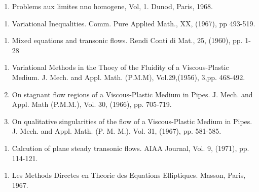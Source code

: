 \begin{thebibliography}{99}

  \begin{enumerate}
  \item Problems aux limites nno homogene, Vol, 1. Dunod, Paris,
 1968.\label{k68:e1} 
  \end{enumerate}
 
 
  \begin{enumerate}
  \item Variational Inequalities. Comm. Pure Applied Math., XX,
 (1967), pp 493-519.\label{k69:e1} 
  \end{enumerate}
 
 
  \begin{enumerate}
  \item Mixed equations and transonic flows. Rendi Conti di Mat., 25,
 (1960), pp. 1-28\label{k70:e1} 
  \end{enumerate}
 
 \pageoriginale
 
  \begin{enumerate}
  \item  Variational Methods in the Thoey of the Fluidity of a
 Viscous-Plastic Medium. J. Mech. and Appl. Math. (P.M.M),
 Vol.29,(1956), 3,pp. 468-492.\label{k71:e1} 

  \item On stagnant flow regions of a Viscous-Plastic Medium in
 Pipes. J. Mech. and  Appl. Math (P.M.M.), Vol. 30, (1966),
 pp. 705-719.\label{k71:e2} 
 
  \item On qualitative singularities of the flow of a Viscous-Plastic
 Medium in Pipes. J. Mech. and Appl. Math. (P. M. M.), Vol. 31,
 (1967), pp. 581-585.\label{k71:e3} 
  \end{enumerate}

 
  \begin{enumerate}
  \item  Calcution of plane steady transonic flows. AIAA Journal,
 Vol. 9, (1971), pp. 114-121.\label{k72:e1} 
  \end{enumerate}

 
  \begin{enumerate}
  \item Les Methods Directes en Theorie des Equations
 Elliptiques. Masson, Paris, 1967.\label{k73:e1} 
  \end{enumerate}
 

\end{thebibliography}
